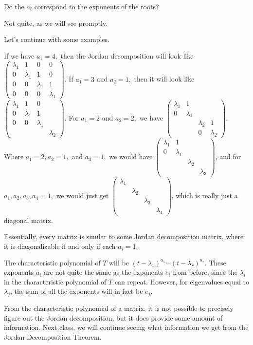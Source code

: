 \begin{question}
Do the $a_i$ correspond to the exponents of the roots?
\end{question}
\begin{ans}
Not quite, as we will see promptly.
\end{ans}

Let's continue with some examples.
\begin{example}[$n = 4$]
If we have $a_1 = 4,$ then the Jordan decomposition will look like 
$ \begin{pmatrix}
\lambda_1 & 1 & 0 & 0 \\
0 & \lambda_1 & 1 & 0 \\
0 & 0 & \lambda_1 & 1 \\
0 & 0 & 0 & \lambda_1
\end{pmatrix}$. If $a_1 = 3$ and $a_2 = 1,$ then it will look like $ \begin{pmatrix}
\lambda_1 & 1 & 0 &  \\
0 & \lambda_1 & 1 &  \\
0 & 0 & \lambda_1 &  \\
 &  &  & \lambda_2
\end{pmatrix}$.  For $a_1 = 2$ and $a_2 = 2,$ we have $\begin{pmatrix}
\lambda_1 & 1 &  &  \\
0 & \lambda_1 &  &  \\
 &  & \lambda_2 &  1\\
 &  & 0 & \lambda_2
\end{pmatrix}$. Where $a_1 = 2, a_2 = 1,$ and $a_3 = 1,$ we would have $\begin{pmatrix}
\lambda_1 & 1 &  &  \\
0 & \lambda_1 &  &  \\
 &  & \lambda_2 &  \\
 &  &  & \lambda_3
\end{pmatrix}$, and for $a_1, a_2, a_3, a_4 = 1,$ we would just get $\begin{pmatrix}
\lambda_1 &  &  &  \\
& \lambda_2 &  &  \\
 &  & \lambda_3&  \\
 &  &  & \lambda_4
\end{pmatrix}$, which is really just a diagonal matrix.
\end{example}

Essentially, every matrix is similar to some Jordan decomposition matrix, where it is diagonalizable if and only if each $a_i = 1.$ 

The characteristic polynomial of $T$ will be $(t-\lambda_1)^{a_1} \cdots (t - \lambda_r)^{a_r}$. These exponents $a_i$ are not quite the same as the exponents $e_i$ from before, since the $\lambda_i$ in the characteristic polynomial of $T$ can repeat. However, for eigenvalues equal to $\lambda_j$, the sum of all the exponents will in fact be $e_j.$ 

From the characteristic polynomial of a matrix, it is not possible to precisely figure out the Jordan decomposition, but it does provide some amount of information. Next class, we will continue seeing what information we get from the Jordan Decomposition Theorem.

\newpage